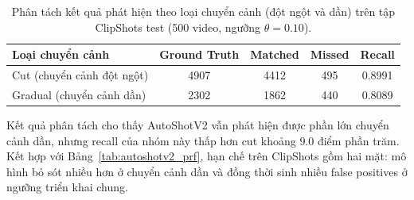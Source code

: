 \begin{table}[H]
\centering
\caption[Phân tách kết quả theo loại chuyển cảnh trên ClipShots]{Phân tách kết quả phát hiện theo loại chuyển cảnh (đột ngột và dần) trên tập ClipShots test (500 video, ngưỡng $\theta = 0.10$).}
\label{tab:clipshots_breakdown}
\small
\begin{tabular}{lcccc}
\toprule
\textbf{Loại chuyển cảnh} & \textbf{Ground Truth} & \textbf{Matched} & \textbf{Missed} & \textbf{Recall} \\
\midrule
Cut (chuyển cảnh đột ngột) & 4907 & 4412 & 495 & 0.8991 \\
Gradual (chuyển cảnh dần) & 2302 & 1862 & 440 & 0.8089 \\
\bottomrule
\end{tabular}
\end{table}

Kết quả phân tách cho thấy AutoShotV2 vẫn phát hiện được phần lớn chuyển cảnh dần, nhưng recall của nhóm này thấp hơn cut khoảng $9.0$ điểm phần trăm. Kết hợp với Bảng~\ref{tab:autoshotv2_prf}, hạn chế trên ClipShots gồm hai mặt: mô hình bỏ sót nhiều hơn ở chuyển cảnh dần và đồng thời sinh nhiều false positives ở ngưỡng triển khai chung.
